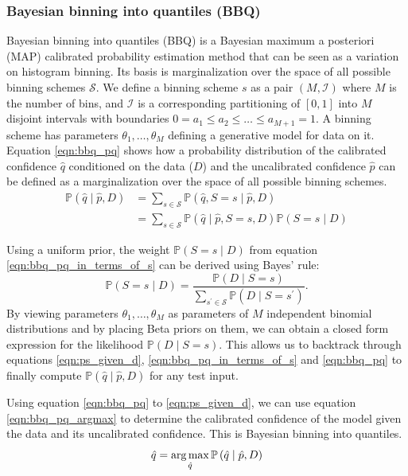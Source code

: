 \subsubsection{Bayesian binning into quantiles (BBQ)}
Bayesian binning into quantiles (BBQ) is a Bayesian maximum a posteriori (MAP) calibrated probability estimation method that can be seen as a variation on histogram binning. Its basis is marginalization over the space of all possible binning schemes $\mathcal{S}$. We define a binning scheme $s$ as a pair $(M, \mathcal{I})$ where $M$ is the number of bins, and $\mathcal{I}$ is a corresponding partitioning of $[0,1]$ into $M$ disjoint intervals with boundaries $0=a_{1} \leq a_{2} \leq \ldots \leq a_{M+1}=1$. A binning scheme has parameters $\theta_{1}, \ldots, \theta_{M}$ defining a generative model for data on it. Equation \ref{eqn:bbq_pq} shows how a probability distribution of the calibrated confidence $\hat{q}$ conditioned on the data ($D$) and the uncalibrated confidence $\hat{p}$ can be defined as a marginalization over the space of all possible binning schemes.
\begin{align}
\label{eqn:bbq_pq}
\mathbb{P}\left(\hat{q} \mid \hat{p}, D\right) &= \sum_{s \in \mathcal{S}} \mathbb{P}\left(\hat{q}, S=s \mid \hat{p}, D\right) \\
\label{eqn:bbq_pq_in_terms_of_s}
&= \sum_{s \in \mathcal{S}} \mathbb{P}\left(\hat{q} \mid \hat{p}, S=s, D\right) \mathbb{P}(S=s \mid D)
\end{align}

Using a uniform prior, the weight $\mathbb{P}(S=s \mid D)$ from equation \ref{eqn:bbq_pq_in_terms_of_s} can be derived using Bayes' rule:
\begin{equation}
\label{eqn:ps_given_d}
\mathbb{P}(S=s \mid D)=\frac{\mathbb{P}(D \mid S=s)}{\sum_{s^{\prime} \in \mathcal{S}} \mathbb{P}\left(D \mid S=s^{\prime}\right)}.
\end{equation}
By viewing parameters $\theta_{1}, \ldots, \theta_{M}$ as parameters of $M$ independent binomial distributions and by placing Beta priors on them, we can obtain a closed form expression for the likelihood $\mathbb{P}(D \mid S=s)$. This allows us to backtrack through equations \ref{eqn:ps_given_d}, \ref{eqn:bbq_pq_in_terms_of_s} and \ref{eqn:bbq_pq} to finally compute $\mathbb{P}\left(\hat{q} \mid \hat{p}, D\right)$ for any test input.

Using equation \ref{eqn:bbq_pq} to \ref{eqn:ps_given_d}, we can use equation \ref{eqn:bbq_pq_argmax} to determine the calibrated confidence of the model given the data and its uncalibrated confidence. This is Bayesian binning into quantiles.
\begin{equation}
\label{eqn:bbq_pq_argmax}
\hat{q} = \operatorname*{arg\,max}_{\hat{q}} \mathbb{P}\left(\hat{q} \mid \hat{p}, D\right)
\end{equation}

